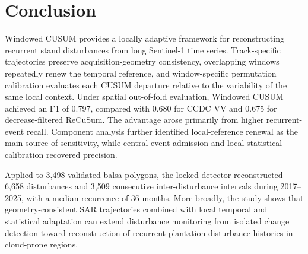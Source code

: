 
\section{Conclusion}

Windowed CUSUM provides a locally adaptive framework for reconstructing recurrent stand disturbances from long Sentinel-1 time series. Track-specific trajectories preserve acquisition-geometry consistency, overlapping windows repeatedly renew the temporal reference, and window-specific permutation calibration evaluates each CUSUM departure relative to the variability of the same local context. Under spatial out-of-fold evaluation, Windowed CUSUM achieved an F1 of 0.797, compared with 0.680 for CCDC VV and 0.675 for decrease-filtered ReCuSum. The advantage arose primarily from higher recurrent-event recall. Component analysis further identified local-reference renewal as the main source of sensitivity, while central event admission and local statistical calibration recovered precision.

Applied to 3,498 validated balsa polygons, the locked detector reconstructed 6,658 disturbances and 3,509 consecutive inter-disturbance intervals during 2017--2025, with a median recurrence of 36 months. More broadly, the study shows that geometry-consistent SAR trajectories combined with local temporal and statistical adaptation can extend disturbance monitoring from isolated change detection toward reconstruction of recurrent plantation disturbance histories in cloud-prone regions.